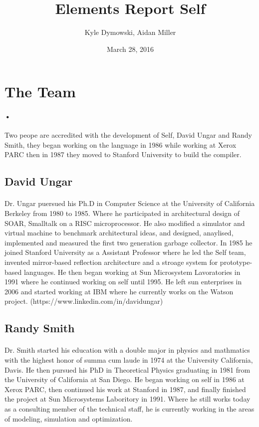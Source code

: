 \documentclass[12pt]{article}
\title{Elements Report Self}
\author{Kyle Dymowski, Aidan Miller}
\date{March 28, 2016}
\begin{document}
\maketitle

\section{The Team}
\paragraph{•} Two peope are accredited with the development of Self, David Ungar and Randy Smith, they began working on the language in 1986 while working at Xerox PARC then in 1987 they moved to Stanford University to build the compiler. 
\subsection{David Ungar}
\paragraph{} Dr. Ungar puersued his Ph.D in Computer Science at the University of California Berkeley from 1980 to 1985. Where he participated in architectural design of SOAR, Smalltalk on a RISC microprocessor. He also modified a simulator and virtual machine to benchmark architectural ideas, and designed, anaylised, implemented and measured the first two generation garbage collector. In 1985 he joined Stanford University as a Assistant Professor where he led the Self team, invented mirror-based reflection architecture and a stroage system for prototype-based languages. He then began working at Sun Microsystem Lavoratories in 1991 where he continued working on self until 1995. He left sun enterprises in 2006 and started working at IBM where he currently works on the Watson project. (https://www.linkedin.com/in/davidungar) 
\subsection{Randy Smith}
\paragraph{} Dr. Smith started his education with a double major in physics and mathmatics with the highest honor of summa cum laude in 1974 at the University California, Davis. He then pursued his PhD in Theoretical Physics graduating in 1981 from the University of California at San Diego. He began working on self in 1986 at Xerox PARC, then continued his work at Stanford in 1987, and finally finished the project at Sun Microsystems Laboritory in 1991. Where he still works today as a consulting member of the technical staff, he is currently working in the areas of modeling, simulation and optimization. 
\end{document}
